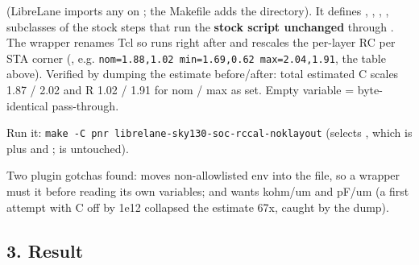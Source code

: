 \begin{record}

 (LibreLane
imports any  on ; the Makefile
adds the directory). It defines ,
, ,
, subclasses of the stock steps that run
the \textbf{stock script unchanged} through . The
wrapper renames Tcl  so  runs
right after  and rescales the per-layer RC per
STA corner (, e.g.
\texttt{nom=\allowbreak{}1.\allowbreak{}88,\allowbreak{}1.\allowbreak{}02\ min=\allowbreak{}1.\allowbreak{}69,\allowbreak{}0.\allowbreak{}62\ max=\allowbreak{}2.\allowbreak{}04,\allowbreak{}1.\allowbreak{}91},
the table above). Verified by dumping the estimate
before/\allowbreak{}after: total estimated C scales 1.87 / 2.02 and R
1.02 / 1.91 for nom / max as set. Empty variable = byte-identical
pass-through.

Run it:
\texttt{make\ -\allowbreak{}C\ pnr\ librelane-\allowbreak{}sky130-\allowbreak{}soc-\allowbreak{}rccal-\allowbreak{}noklayout}
(selects , which is  plus
 and ;
 is untouched).

Two plugin gotchas found:  moves non-allowlisted env into
the  file, so a wrapper must  it before
reading its own variables; and  wants kohm/um and
pF/um (a first attempt with C off by 1e12 collapsed the estimate 67x,
caught by the dump).

\end{record}

\subsection{3. Result}\label{cr:defect:sky130-slew-cap-e45j:3-result}


